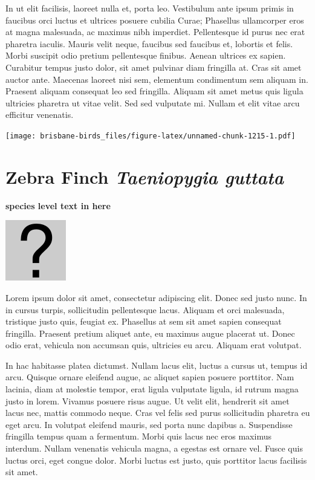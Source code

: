 \documentclass[]{book}
\let\origfigure\figure
\let\endorigfigure\endfigure
\renewenvironment{figure}[1][2] {
  \expandafter\origfigure\expandafter[H]
} {
  \endorigfigure
}
\begin{document}
In ut elit facilisis, laoreet nulla et, porta leo. Vestibulum ante ipsum
primis in faucibus orci luctus et ultrices posuere cubilia Curae;
Phasellus ullamcorper eros at magna malesuada, ac maximus nibh
imperdiet. Pellentesque id purus nec erat pharetra iaculis. Mauris velit
neque, faucibus sed faucibus et, lobortis et felis. Morbi suscipit odio
pretium pellentesque finibus. Aenean ultrices ex sapien. Curabitur
tempus justo dolor, sit amet pulvinar diam fringilla at. Cras sit amet
auctor ante. Maecenas laoreet nisi sem, elementum condimentum sem
aliquam in. Praesent aliquam consequat leo sed fringilla. Aliquam sit
amet metus quis ligula ultricies pharetra ut vitae velit. Sed sed
vulputate mi. Nullam et elit vitae arcu efficitur venenatis.

\begin{figure}
\centering
\texttt{[image: brisbane-birds\_files/figure-latex/unnamed-chunk-1215-1.pdf]}
\caption{\label{fig:unnamed-chunk-1215}insert figure caption}
\end{figure}

\section{\texorpdfstring{Zebra Finch \emph{Taeniopygia
guttata}}{Zebra Finch Taeniopygia guttata}}\label{zebra-finch-taeniopygia-guttata}

\textbf{species level text in here}

\begin{figure}
\centering
\includegraphics{assets/missing.png}
\caption{No image for species}
\end{figure}

Lorem ipsum dolor sit amet, consectetur adipiscing elit. Donec sed justo
nunc. In in cursus turpis, sollicitudin pellentesque lacus. Aliquam et
orci malesuada, tristique justo quis, feugiat ex. Phasellus at sem sit
amet sapien consequat fringilla. Praesent pretium aliquet ante, eu
maximus augue placerat ut. Donec odio erat, vehicula non accumsan quis,
ultricies eu arcu. Aliquam erat volutpat.

In hac habitasse platea dictumst. Nullam lacus elit, luctus a cursus ut,
tempus id arcu. Quisque ornare eleifend augue, ac aliquet sapien posuere
porttitor. Nam lacinia, diam at molestie tempor, erat ligula vulputate
ligula, id rutrum magna justo in lorem. Vivamus posuere risus augue. Ut
velit elit, hendrerit sit amet lacus nec, mattis commodo neque. Cras vel
felis sed purus sollicitudin pharetra eu eget arcu. In volutpat eleifend
mauris, sed porta nunc dapibus a. Suspendisse fringilla tempus quam a
fermentum. Morbi quis lacus nec eros maximus interdum. Nullam venenatis
vehicula magna, a egestas est ornare vel. Fusce quis luctus orci, eget
congue dolor. Morbi luctus est justo, quis porttitor lacus facilisis sit
amet.
\end{document}
